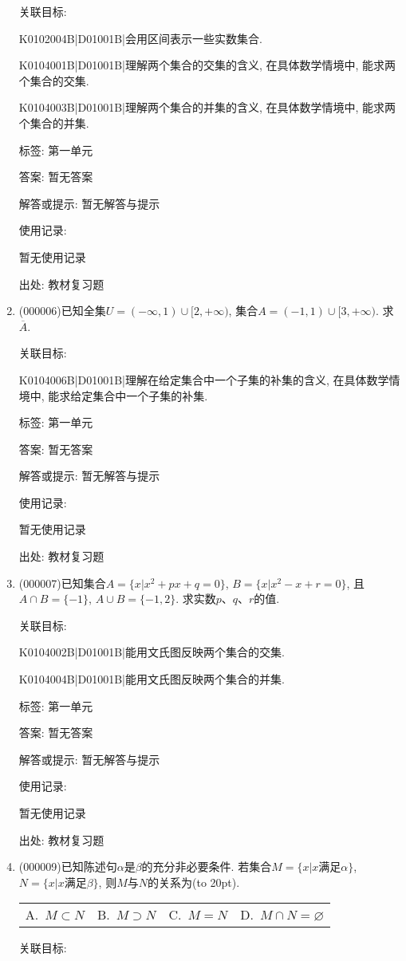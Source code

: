 \documentclass[10pt,a4paper]{article}
\newcommand{\bracket}[1]{(\hbox to #1pt{})}
\newcommand{\fourch}[4]{\par\begin{tabular}{p{.23\textwidth}p{.23\textwidth}p{.23\textwidth}p{.23\textwidth}}
A.~#1 &B.~#2& C.~#3& D.~#4
\end{tabular}}
\begin{document}
\begin{enumerate}[1.]
关联目标:

K0102004B|D01001B|会用区间表示一些实数集合.

K0104001B|D01001B|理解两个集合的交集的含义, 在具体数学情境中, 能求两个集合的交集.

K0104003B|D01001B|理解两个集合的并集的含义, 在具体数学情境中, 能求两个集合的并集.



标签: 第一单元

答案: 暂无答案

解答或提示: 暂无解答与提示

使用记录:

暂无使用记录


出处: 教材复习题
\item { (000006)}已知全集$U=(-\infty, 1)\cup [2, +\infty)$, 集合$A=(-1, 1)\cup [3, +\infty)$. 求$\overline{A}$.


关联目标:

K0104006B|D01001B|理解在给定集合中一个子集的补集的含义, 在具体数学情境中, 能求给定集合中一个子集的补集.



标签: 第一单元

答案: 暂无答案

解答或提示: 暂无解答与提示

使用记录:

暂无使用记录


出处: 教材复习题
\item { (000007)}已知集合$A=\{x|x^2+px+q=0\}$, $B=\{x|x^2-x+r=0\}$, 且$A\cap B=\{-1\}$, $A\cup B=\{-1, 2\}$. 求实数$p$、$q$、$r$的值.


关联目标:

K0104002B|D01001B|能用文氏图反映两个集合的交集.

K0104004B|D01001B|能用文氏图反映两个集合的并集.



标签: 第一单元

答案: 暂无答案

解答或提示: 暂无解答与提示

使用记录:

暂无使用记录


出处: 教材复习题
\item { (000009)}已知陈述句$\alpha$是$\beta$的充分非必要条件. 若集合$M=\{x|x\text{满足}\alpha\}$, $N=\{x|x\text{满足}\beta\}$, 则$M$与$N$的关系为\bracket{20}.
\fourch{$M\subset N$}{$M\supset N$}{$M=N$}{$M\cap N=\varnothing$}


关联目标:


\end{enumerate}
\end{document}
